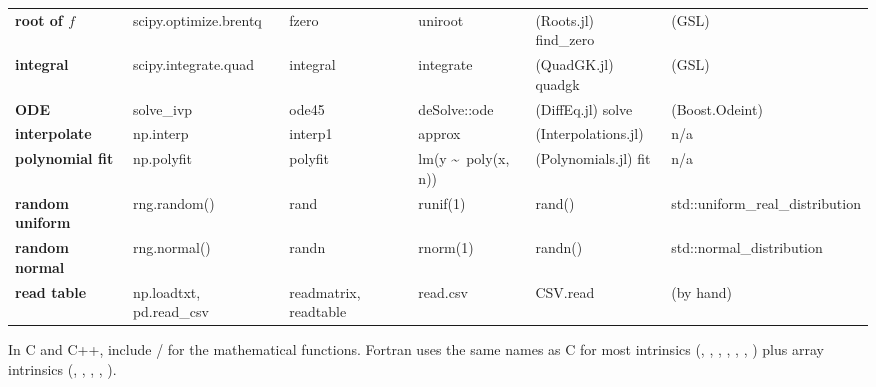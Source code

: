 \begin{table}
{\begin{tabular}{@{}>{\bfseries}l>{\ttfamily}l>{\ttfamily}l>{\ttfamily}l>{\ttfamily}l>{\ttfamily}l@{}}
root of $f$ & scipy.optimize.brentq & fzero & uniroot & (Roots.jl) find\_zero & (GSL)\\
integral & scipy.integrate.quad & integral & integrate & (QuadGK.jl) quadgk & (GSL)\\
ODE & solve\_ivp & ode45 & deSolve::ode & (DiffEq.jl) solve & (Boost.Odeint)\\
interpolate & np.interp & interp1 & approx & (Interpolations.jl) & {\normalfont n/a}\\
polynomial fit & np.polyfit & polyfit & lm(y \textasciitilde\ poly(x, n)) & (Polynomials.jl) fit & {\normalfont n/a}\\
random uniform & rng.random() & rand & runif(1) & rand() & std::uniform\_real\_distribution\\
random normal & rng.normal() & randn & rnorm(1) & randn() & std::normal\_distribution\\
read table & np.loadtxt, pd.read\_csv & readmatrix, readtable & read.csv & CSV.read & (by hand)\\
\bottomrule
\end{tabular}}
\end{table}

\noindent In C and C++, include / for the mathematical functions.
Fortran uses the same names as C for most intrinsics (, , ,
, , , ) plus array intrinsics (,
, , , ).


